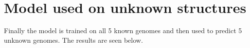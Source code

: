 \documentclass[paper=a4, fontsize=11pt]{scrartcl} %
\numberwithin{equation}{section} %
\numberwithin{figure}{section} %
\numberwithin{table}{section} %
\begin{document}
\section{Model used on unknown structures}
Finally the model is trained on all 5 known genomes and then used to predict 5 unknown genomes. The results are seen below. 


\end{document}
